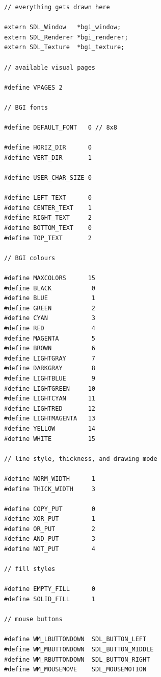 \documentclass[a4paper,11pt]{article}
\begin{document}
\begin{small}
\begin{verbatim}
// everything gets drawn here

extern SDL_Window   *bgi_window;
extern SDL_Renderer *bgi_renderer;
extern SDL_Texture  *bgi_texture;

// available visual pages

#define VPAGES 2

// BGI fonts

#define DEFAULT_FONT   0 // 8x8

#define HORIZ_DIR      0
#define VERT_DIR       1

#define USER_CHAR_SIZE 0

#define LEFT_TEXT      0
#define CENTER_TEXT    1
#define RIGHT_TEXT     2
#define BOTTOM_TEXT    0
#define TOP_TEXT       2

// BGI colours

#define MAXCOLORS      15
#define BLACK           0
#define BLUE            1
#define GREEN           2
#define CYAN            3
#define RED             4
#define MAGENTA         5
#define BROWN           6
#define LIGHTGRAY       7
#define DARKGRAY        8
#define LIGHTBLUE       9
#define LIGHTGREEN     10
#define LIGHTCYAN      11
#define LIGHTRED       12
#define LIGHTMAGENTA   13
#define YELLOW         14
#define WHITE          15

// line style, thickness, and drawing mode

#define NORM_WIDTH      1
#define THICK_WIDTH     3

#define COPY_PUT        0
#define XOR_PUT         1
#define OR_PUT          2
#define AND_PUT         3
#define NOT_PUT         4

// fill styles

#define EMPTY_FILL      0
#define SOLID_FILL      1

// mouse buttons

#define WM_LBUTTONDOWN  SDL_BUTTON_LEFT
#define WM_MBUTTONDOWN  SDL_BUTTON_MIDDLE
#define WM_RBUTTONDOWN  SDL_BUTTON_RIGHT
#define WM_MOUSEMOVE    SDL_MOUSEMOTION


\end{verbatim}
\end{small}
\end{document}
